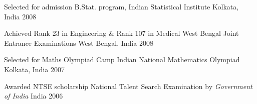 \begin{cvhonors}
    
  \cvhonor
    {Selected for admission} %
    {B.Stat. program, Indian Statistical Institute} %
    {Kolkata, India} %
    {2008} %

  \cvhonor
    {Achieved Rank 23 in Engineering \& Rank 107 in Medical} %
    {West Bengal Joint Entrance Examinations} %
    {West Bengal, India} %
    {2008} %
    
  \cvhonor
    {Selected for Maths Olympiad Camp} %
    {Indian National Mathematics Olympiad} %
    {Kolkata, India} %
    {2007} %
    
  \cvhonor
    {Awarded NTSE scholarship} %
    {National Talent Search Examination by \textit{Government of India}} %
    {India} %
    {2006} %

\end{cvhonors}
